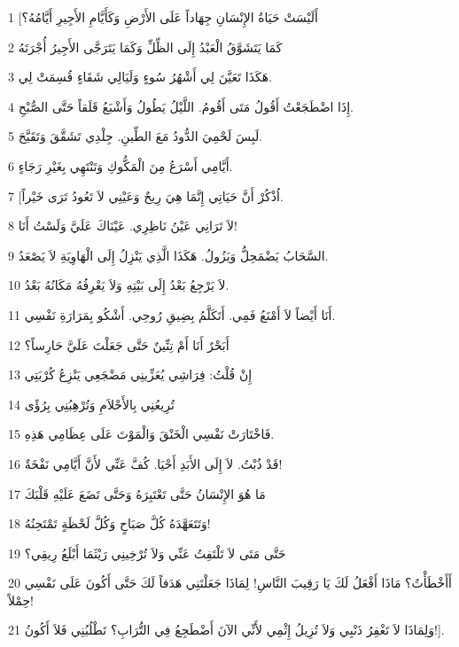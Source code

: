 \par 1 [أَلَيْسَتْ حَيَاةُ الإِنْسَانِ جِهَاداً عَلَى الأَرْضِ وَكَأَيَّامِ الأَجِيرِ أَيَّامُهُ؟
\par 2 كَمَا يَتَشَوَّقُ الْعَبْدُ إِلَى الظِّلِّ وَكَمَا يَتَرَجَّى الأَجِيرُ أُجْرَتَهُ
\par 3 هَكَذَا تَعَيَّنَ لِي أَشْهُرُ سُوءٍ وَلَيَالِي شَقَاءٍ قُسِمَتْ لِي.
\par 4 إِذَا اضْطَجَعْتُ أَقُولُ مَتَى أَقُومُ. اللَّيْلُ يَطُولُ وَأَشْبَعُ قَلَقاً حَتَّى الصُّبْحِ.
\par 5 لَبِسَ لَحْمِيَ الدُّودُ مَعَ الطِّينِ. جِلْدِي تَشَقَّقَ وَتَقَيَّحَ.
\par 6 أَيَّامِي أَسْرَعُ مِنَ الْمَكُّوكِ وَتَنْتَهِي بِغَيْرِ رَجَاءٍ.
\par 7 [اُذْكُرْ أَنَّ حَيَاتِي إِنَّمَا هِيَ رِيحٌ وَعَيْنِي لاَ تَعُودُ تَرَى خَيْراً.
\par 8 لاَ تَرَانِي عَيْنُ نَاظِرِي. عَيْنَاكَ عَلَيَّ وَلَسْتُ أَنَا!
\par 9 السَّحَابُ يَضْمَحِلُّ وَيَزُولُ. هَكَذَا الَّذِي يَنْزِلُ إِلَى الْهَاوِيَةِ لاَ يَصْعَدُ.
\par 10 لاَ يَرْجِعُ بَعْدُ إِلَى بَيْتِهِ وَلاَ يَعْرِفُهُ مَكَانُهُ بَعْدُ.
\par 11 أَنَا أَيْضاً لاَ أَمْنَعُ فَمِي. أَتَكَلَّمُ بِضِيقِ رُوحِي. أَشْكُو بِمَرَارَةِ نَفْسِي.
\par 12 أَبَحْرٌ أَنَا أَمْ تِنِّينٌ حَتَّى جَعَلْتَ عَلَيَّ حَارِساً؟
\par 13 إِنْ قُلْتُ: فِرَاشِي يُعَزِّينِي مَضْجَعِي يَنْزِعُ كُرْبَتِي
\par 14 تُرِيعُنِي بِالأَحْلاَمِ وَتُرْهِبُنِي بِرُؤًى
\par 15 فَاخْتَارَتْ نَفْسِي الْخَنْقَ وَالْمَوْتَ عَلَى عِظَامِي هَذِهِ.
\par 16 قَدْ ذُبْتُ. لاَ إِلَى الأَبَدِ أَحْيَا. كُفَّ عَنِّي لأَنَّ أَيَّامِي نَفْخَةٌ!
\par 17 مَا هُوَ الإِنْسَانُ حَتَّى تَعْتَبِرَهُ وَحَتَّى تَضَعَ عَلَيْهِ قَلْبَكَ
\par 18 وَتَتَعَهَّدَهُ كُلَّ صَبَاحٍ وَكُلَّ لَحْظَةٍ تَمْتَحِنُهُ!
\par 19 حَتَّى مَتَى لاَ تَلْتَفِتُ عَنِّي وَلاَ تُرْخِينِي رَيْثَمَا أَبْلَعُ رِيقِي؟
\par 20 أَأَخْطَأْتُ؟ مَاذَا أَفْعَلُ لَكَ يَا رَقِيبَ النَّاسِ! لِمَاذَا جَعَلْتَنِي هَدَفاً لَكَ حَتَّى أَكُونَ عَلَى نَفْسِي حِمْلاً!
\par 21 وَلِمَاذَا لاَ تَغْفِرُ ذَنْبِي وَلاَ تُزِيلُ إِثْمِي لأَنِّي الآنَ أَضْطَجِعُ فِي التُّرَابِ؟ تَطْلُبُنِي فَلاَ أَكُونُ!].

